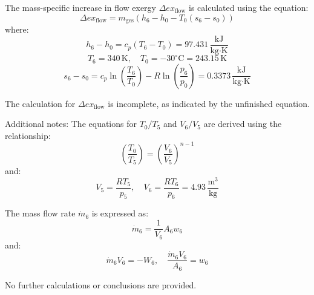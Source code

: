 The mass-specific increase in flow exergy \( \Delta ex_{\text{flow}} \) is calculated using the equation:  
\[
\Delta ex_{\text{flow}} = m_{\text{ges}} \left( h_6 - h_0 - T_0 (s_6 - s_0) \right)
\]  
where:  
\[
h_6 - h_0 = c_p (T_6 - T_0) = 97.431 \, \frac{\text{kJ}}{\text{kg·K}}
\]  
\[
T_6 = 340 \, \text{K}, \quad T_0 = -30^\circ\text{C} = 243.15 \, \text{K}
\]  
\[
s_6 - s_0 = c_p \ln \left( \frac{T_6}{T_0} \right) - R \ln \left( \frac{p_6}{p_0} \right) = 0.3373 \, \frac{\text{kJ}}{\text{kg·K}}
\]  

The calculation for \( \Delta ex_{\text{flow}} \) is incomplete, as indicated by the unfinished equation.  

Additional notes:  
The equations for \( T_0 / T_5 \) and \( V_6 / V_5 \) are derived using the relationship:  
\[
\left( \frac{T_0}{T_5} \right) = \left( \frac{V_6}{V_5} \right)^{n-1}
\]  
and:  
\[
V_5 = \frac{R T_5}{p_5}, \quad V_6 = \frac{R T_6}{p_6} = 4.93 \, \frac{\text{m}^3}{\text{kg}}
\]  

The mass flow rate \( \dot{m}_6 \) is expressed as:  
\[
\dot{m}_6 = \frac{1}{V_6} A_6 w_6
\]  
and:  
\[
\dot{m}_6 V_6 = -W_6, \quad \frac{\dot{m}_6 V_6}{A_6} = w_6
\]  

No further calculations or conclusions are provided.
